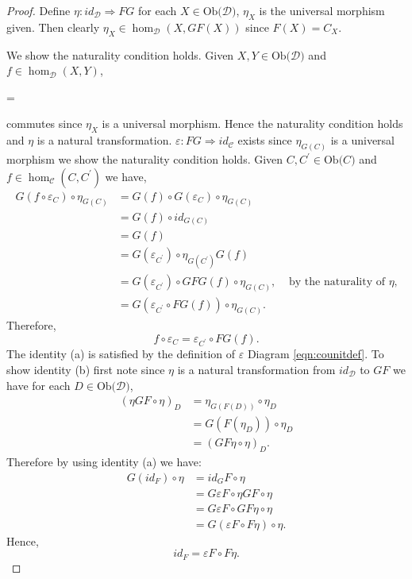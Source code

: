 \documentclass[11pt,a4paper]{article}
\theoremstyle{definition}
\newcommand\ho[3][]{\hom_{#1}(#2,#3)}
\newcommand\ob[1]{\mathrm{Ob(}#1\mathrm{)}}
\newcommand\cat[1]{\mathscr{#1}}
\newcommand\nattran[3]{#1\colon#2\Rightarrow#3}
\numberwithin{equation}{section}
\begin{document}
\begin{proof}
Define $\nattran{\eta}{id_{\cat{D}}}{FG}$ for each $X\in\ob{\cat{D}}$, $\eta_{X}$ is the universal morphism given. Then clearly $\eta_{X}\in\ho[\cat{D}]{X}{GF(X)}$ since $F(X) = C_{X}$. 

We show the naturality condition holds. Given $X,Y\in\ob{\cat{D}}$ and $f\in\ho[\cat{D}]{X}{Y}$,
\begin{center}
     = 
    \end{center}
commutes since $\eta_{X}$ is a universal morphism. Hence the naturality condition holds and $\eta$ is a natural transformation. $\nattran{\varepsilon}{FG}{id_{\cat{C}}}$ exists since $\eta_{G(C)}$ is a universal morphism we show the naturality condition holds. Given $C,C^\prime\in\ob{C}$ and $f\in\ho[\cat{C}]{C}{C^\prime}$ we have,
\begin{align*}
    G(f\circ \varepsilon_{C})\circ \eta_{G(C)} &= G(f)\circ G(\varepsilon_{C}) \circ \eta_{G(C)}\\
    &= G(f) \circ id_{G(C)} \\
    &= G(f) \\
    &= G(\varepsilon_{C^\prime}) \circ \eta_{G(C^\prime)} G(f) \\
    &= G(\varepsilon_{C^\prime}) \circ GFG(f)\circ \eta_{G(C)}, &\text{ by the naturality of $\eta$,}\\
    &= G(\varepsilon_{C^\prime}\circ FG(f)) \circ \eta_{G(C)}.
\end{align*}
Therefore, \[f\circ \varepsilon_{C} = \varepsilon_{C^\prime}\circ FG(f).\]
The identity (a) is satisfied by the definition of $\varepsilon$ Diagram \eqref{eqn:counitdef}.
To show identity (b) first note since $\eta$ is a natural transformation from $id_{\cat{D}}$ to $GF$ we have for each $D\in\ob{\cat{D}}$,
\begin{align*}
(\eta GF \circ \eta)_D &= \eta_{G(F(D))} \circ \eta_D \\
&= G(F(\eta_D)) \circ \eta_{D}\\
&=(GF\eta \circ \eta)_D.
\end{align*} 
Therefore by using identity (a) we have:
\begin{align*}
    G(id_{F})\circ \eta &= id_{G}F \circ \eta \\
    &= G\varepsilon F \circ \eta GF \circ \eta \\
    &= G\varepsilon F \circ GF \eta \circ \eta \\
    &= G(\varepsilon F \circ F\eta)\circ \eta.
\end{align*}
Hence,
\[id_{F} = \varepsilon F \circ F\eta.\]

\end{proof}
\end{document}
